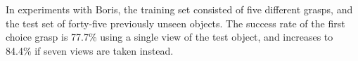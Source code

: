 In experiments with Boris, the training set consisted of five different grasps, and the test set of forty-five previously unseen objects. The success rate of the first choice grasp is 77.7\% using a single view of the test object, and increases to 84.4\% if seven views are taken instead.
%
